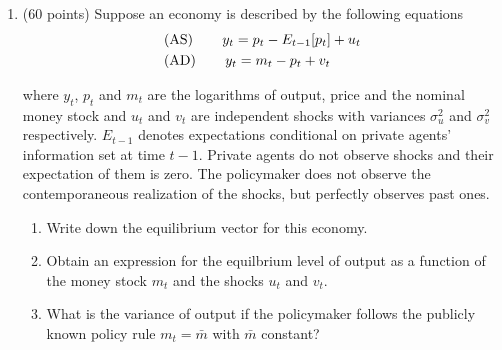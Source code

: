 \documentclass[12pt,a4paper]{article}
\begin{document}
\begin{enumerate}
\item (60 points) Suppose an economy is described by the following equations 
\begin{align}
&\text{(AS)\hspace{0.29in}}y_{t}=p_{t}-E_{t-1}[p_{t}]+u_{t}\nonumber \\ 
&\text{(AD)\hspace{0.29in}}y_{t}=m_{t}-p_{t}+v_{t}\nonumber
\end{align}

where $y_{t}$, $p_{t}$ and $m_{t}$ are the logarithms of output, price
and the nominal money stock and $u_{t}$ and $v_{t}$ are independent
shocks with variances $\sigma _{u}^{2}$ and $\sigma _{v}^{2}$
respectively. $E_{t-1}$ denotes expectations conditional on private
agents' information set at time $t-1.$ Private agents do not observe
shocks and their expectation of them is zero. The policymaker does not
observe the contemporaneous realization of the shocks, but perfectly
observes past ones.

\begin{enumerate}
\item Write down the equilibrium vector for this economy.
\item Obtain an expression for the equilbrium level of output as a
  function of the money stock $m_{t}$ and the shocks $u_{t}$ and
  $v_{t}.$

\item  What is the variance of output if the policymaker follows the
publicly known policy rule $m_{t}=\bar{m}$ with $\bar{m}$ constant?


\end{enumerate}
\end{enumerate}
\end{document}
